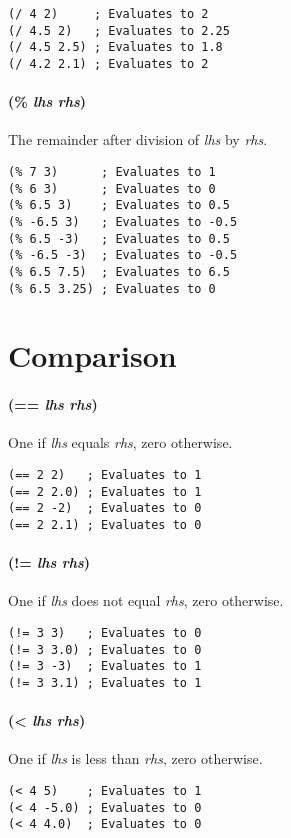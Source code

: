 \documentclass[twoside=false, numbers=noenddot]{scrbook}
\begin{document}
\begin{verbatim}
(/ 4 2)     ; Evaluates to 2
(/ 4.5 2)   ; Evaluates to 2.25
(/ 4.5 2.5) ; Evaluates to 1.8
(/ 4.2 2.1) ; Evaluates to 2
\end{verbatim}

\paragraph{(\% \emph{lhs} \emph{rhs})}
The remainder after division of \emph{lhs} by \emph{rhs}.

\begin{verbatim}
(% 7 3)      ; Evaluates to 1
(% 6 3)      ; Evaluates to 0
(% 6.5 3)    ; Evaluates to 0.5
(% -6.5 3)   ; Evaluates to -0.5
(% 6.5 -3)   ; Evaluates to 0.5
(% -6.5 -3)  ; Evaluates to -0.5
(% 6.5 7.5)  ; Evaluates to 6.5
(% 6.5 3.25) ; Evaluates to 0
\end{verbatim}

\section{Comparison}
\paragraph{(== \emph{lhs} \emph{rhs})}
One if \emph{lhs} equals \emph{rhs}, zero otherwise.

\begin{verbatim}
(== 2 2)   ; Evaluates to 1
(== 2 2.0) ; Evaluates to 1
(== 2 -2)  ; Evaluates to 0
(== 2 2.1) ; Evaluates to 0
\end{verbatim}

\paragraph{(!= \emph{lhs} \emph{rhs})}
One if \emph{lhs} does not equal \emph{rhs}, zero otherwise.

\begin{verbatim}
(!= 3 3)   ; Evaluates to 0
(!= 3 3.0) ; Evaluates to 0
(!= 3 -3)  ; Evaluates to 1
(!= 3 3.1) ; Evaluates to 1
\end{verbatim}

\paragraph{(< \emph{lhs} \emph{rhs})}
One if \emph{lhs} is less than \emph{rhs}, zero otherwise.

\begin{verbatim}
(< 4 5)    ; Evaluates to 1
(< 4 -5.0) ; Evaluates to 0
(< 4 4.0)  ; Evaluates to 0
\end{verbatim}
\end{document}

